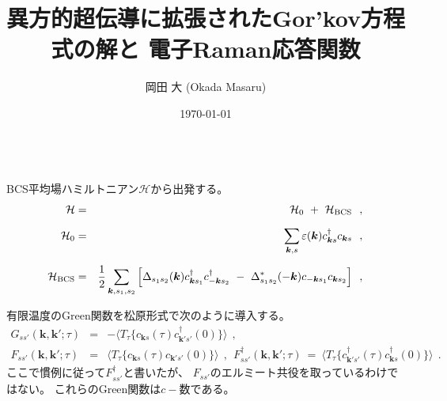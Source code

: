 \documentclass[a4j]{jsarticle}
\title{
\hspace{3em} 異方的超伝導に拡張されたGor'kov方程式の解と \newline 電子Raman応答関数
}
\author{岡田 大 (Okada Masaru)}
\date{\today}
\begin{document}
\maketitle
\ \\[-15mm]





BCS平均場ハミルトニアン$\mathcal{H}$から出発する。
%
%
%
%
\begin{eqnarray}
	\mathcal{H}
	&=&
	\mathcal{H}_{0}
	\ + \
	\mathcal{H}_{\rm BCS}
	\ \ ,
	\nonumber \\[2mm]
	\mathcal{H}_{0}
	&=&
	\sum_{\bm{k},s}
	\varepsilon(\bm{k})
	c_{\bm{k} s}^{\dagger}
	c_{\bm{k} s}
	\ \ ,
	\nonumber \\[2mm]
	\mathcal{H}_{\rm BCS}
	&=&
	\dfrac{1}{2}
	\sum_{\bm{k},s_{1},s_{2}}
	\Big[
		\Delta_{ s_{1} s_{2} }( \bm{k} )
		c_{\bm{k} s_{1}}^{\dagger}
		c_{-\bm{k} s_{2}}^{\dagger}
		\ - \
		\Delta_{ s_{1} s_{2} }^{*}( - \bm{k} )
		c_{-\bm{k} s_{1}}
		c_{\bm{k} s_{2}}
		\Big]
	\ \ ,
\end{eqnarray}
%
%
%
%

有限温度のGreen関数を松原形式で次のように導入する。
%
%
%
%
\begin{eqnarray}
	G_{ss'}(\bm{k} , \bm{k}' ; \tau)
	&=&
	-
	\langle T_{\tau} \{ c_{\bm{k}s}(\tau) c_{\bm{k}'s'}^{\dagger}(0) \} \rangle
	\ \ ,
	\\[3mm]
	F_{ss'}(\bm{k} , \bm{k}' ; \tau)
	&=&
	\langle T_{\tau} \{ c_{\bm{k}s}(\tau) c_{\bm{k}'s'}(0) \} \rangle
	\ \ , \ \
	F_{ss'}^{\dagger}(\bm{k} , \bm{k}' ; \tau)
	\ = \
	\langle T_{\tau} \{ c_{\bm{k}' s' }^{\dagger}(\tau) c_{\bm{k} s }^{\dagger}(0) \} \rangle
	\ \ .
\end{eqnarray}
%
%
%
%
ここで慣例に従って$F_{ss'}^{\dagger}$と書いたが、
$F_{ss'}$のエルミート共役を取っているわけではない。
これらのGreen関数は$c-$数である。
\end{document}
